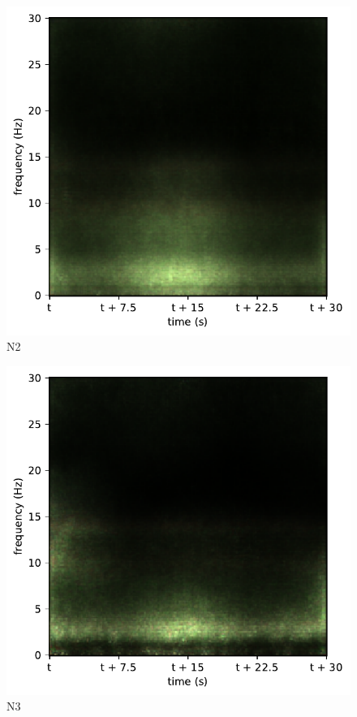 \begin{subfigure}{.16\textwidth}
  \centering
  \includegraphics[width=1\linewidth]{./../Article/pics/class_master_2}
  \caption{N2}
  \label{fig_1_23}
\end{subfigure}%
\begin{subfigure}{.16\textwidth}
  \centering
  \includegraphics[width=1\linewidth]{./../Article/pics/class_master_3}
  \caption{N3}
  \label{fig_1_24}
\end{subfigure}%
